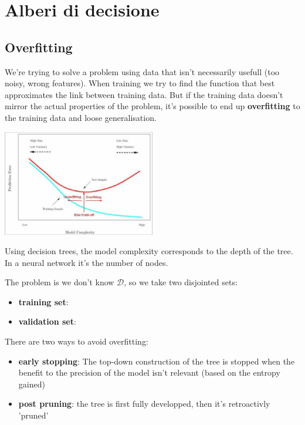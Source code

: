 % 
\chapter{Alberi di decisione}

\section{Overfitting}
We're trying to solve a problem using data that isn't necessarily usefull (too noisy, wrong features). When training we try to find the function that best approximates the link between training data. But if the training data doesn't mirror the actual properties of the problem, it's possible to end up \textbf{overfitting} to the training data and loose generalisation.
\begin{center}
  \includegraphics[width=0.5\textwidth]{img/2025-10-02-13-33-49.png}
\end{center}
Using decision trees, the model complexity corresponds to the depth of the tree. In a neural network it's the number of nodes.


The problem is we don't know $ \mathcal{D} $, so we take two disjointed sets:
\begin{itemize}
\item \textbf{training set}: 
\item \textbf{validation set}: 
\end{itemize}

There are two ways to avoid overfitting:
\begin{itemize}
  \item \textbf{early stopping}: The top-down construction of the tree is stopped when the benefit to the precision of the model isn't relevant (based on the entropy gained)
  \item \textbf{post pruning}: the tree is first fully developped, then it's retroactivly 'pruned'
\end{itemize}

